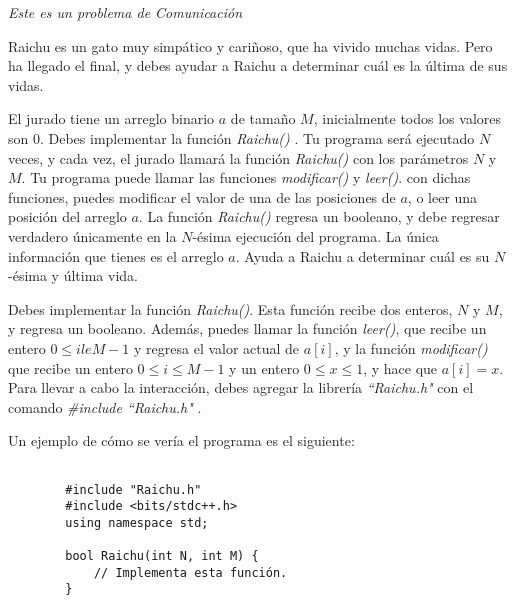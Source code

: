 \documentclass[12pt]{scrartcl}
\begin{document}
    
    {\itshape Este es un problema de Comunicación}
    
    \vspace{10pt}

        Raichu es un gato muy simpático y cariñoso, que ha vivido muchas vidas. Pero ha llegado el final, y debes ayudar a Raichu a determinar cuál es la última de sus vidas. 


        El jurado tiene un arreglo binario $a$ de tamaño $M$, inicialmente todos los valores son $0$. Debes implementar la función {\itshape Raichu()} . Tu programa será ejecutado $N$  veces, y cada vez, el jurado llamará la función {\itshape Raichu()} con los parámetros $N$ y $M$. Tu programa puede llamar las funciones {\itshape modificar() } y {\itshape leer()}. con dichas funciones, puedes modificar el valor de una de las posiciones de $a$, o leer una posición del arreglo $a$. La función {\itshape Raichu()} regresa un booleano, y debe regresar verdadero únicamente en la $N$-ésima ejecución del programa. La única información que tienes es el arreglo $a$. Ayuda a Raichu a determinar cuál es su $N$-ésima y última vida.



        Debes implementar la función {\itshape Raichu()}. Esta función recibe dos enteros, $N$ y $M$, y regresa un booleano. Además, puedes llamar la función {\itshape leer()}, que recibe un entero $0 \le i le M - 1$ y regresa el valor actual de $a[i]$, y la función {\itshape modificar()} que recibe un entero $0 \le i \le M - 1$ y un entero $0 \le x \le 1$, y hace que $a[i] = x$.
        Para llevar a cabo la interacción, debes agregar la librería \textit{``Raichu.h" } con el comando \textit{\#include ``Raichu.h" }. 

        Un ejemplo de cómo se vería el programa es el siguiente:

        \begin{verbatim}

        #include "Raichu.h"
        #include <bits/stdc++.h>
        using namespace std;

        bool Raichu(int N, int M) {
            // Implementa esta función.
        }
            
        \end{verbatim}
        

\end{document}
